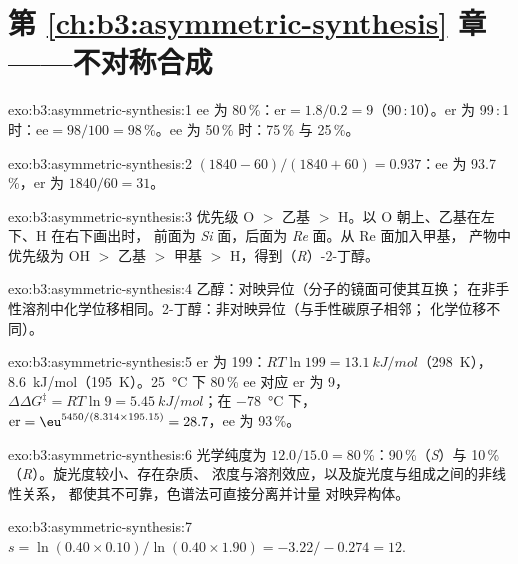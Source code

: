 \section*{第 \ref{ch:b3:asymmetric-synthesis} 章——不对称合成}

\begin{solution}{exo:b3:asymmetric-synthesis:1}
ee 为 80\,\%：$\mathrm{er} = 1.8/0.2 = 9$（90\,:\,10）。er 为 99\,:\,1 时：$\mathrm{ee} = 98/100 = 98$\,\%。ee 为 50\,\% 时：75\,\% 与 25\,\%。
\end{solution}

\begin{solution}{exo:b3:asymmetric-synthesis:2}
$(1840 - 60)/(1840 + 60) = 0.937$：ee 为 93.7\,\%，er 为 $1840/60 = 31$。
\end{solution}

\begin{solution}{exo:b3:asymmetric-synthesis:3}
优先级 O $>$ 乙基 $>$ H。以 O 朝上、乙基在左下、H 在右下画出时，
前面为 \textit{Si} 面，后面为 \textit{Re} 面。从 Re 面加入甲基，
产物中优先级为 OH $>$ 乙基 $>$ 甲基 $>$ H，得到（\textit{R}）-2-丁醇。
\end{solution}

\begin{solution}{exo:b3:asymmetric-synthesis:4}
乙醇：对映异位（分子的镜面可使其互换；
在非手性溶剂中化学位移相同。2-丁醇：非对映异位（与手性碳原子相邻；
化学位移不同）。
\end{solution}

\begin{solution}{exo:b3:asymmetric-synthesis:5}
er 为 199：$RT\ln 199 = \qty{13.1}{kJ/mol}$（\qty{298}{K}），\qty{8.6}{kJ/mol}（\qty{195}{K}）。\qty{25}{\celsius} 下 80\,\% ee 对应 er 为 9，
$\Delta\Delta G^\ddagger = RT\ln 9 = \qty{5.45}{kJ/mol}$；在 \qty{-78}{\celsius} 下，$\mathrm{er} = \eu^{5450/(8.314 \times 195.15)} = 28.7$，ee 为 93\,\%。
\end{solution}

\begin{solution}{exo:b3:asymmetric-synthesis:6}
光学纯度为 $12.0/15.0 = 80$\,\%：90\,\%（\textit{S}）与 10\,\%（\textit{R}）。旋光度较小、存在杂质、
浓度与溶剂效应，以及旋光度与组成之间的非线性关系，
都使其不可靠，色谱法可直接分离并计量
对映异构体。
\end{solution}

\begin{solution}{exo:b3:asymmetric-synthesis:7}
$s = \ln(0.40 \times 0.10)/\ln(0.40 \times 1.90) = -3.22/-0.274 = 12$.
\end{solution}

